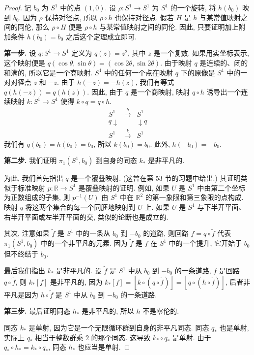 \begin{proof}
记 $b_0$ 为 $S^{1}$ 中的点 $(1,0)$. 设 $\rho\colon S^{1}\to S^{1}$ 为 $S^{1}$ 的一个旋转, 将 $h(b_0)$ 映到 $b_0$. 因为 $\rho$ 保持对径点, 所以 $\rho\circ h$ 也保持对径点. 假若 $H$ 是 $h$ 与某常值映射之间的同伦, 那么 $\rho\circ H$ 便是 $\rho\circ h$ 与某常值映射之间的同伦. 因此, 只要证明加上附加条件 $h(b_0)=b_0$ 之后这个定理成立即可.

\textbf{第一步.} 设 $q\colon S^{1}\to S^{1}$ 定义为 $q(z)=z^2$, 其中 $z$ 是一个复数. 如果用实坐标表示, 这个映射便是 $q(\cos\theta,\sin\theta)=(\cos 2\theta,\sin 2\theta)$. 由于映射 $q$ 是连续的、闭的和满的, 所以它是一个商映射. $S^{1}$ 中的任何一个点在映射 $q$ 下的原像是 $S^{1}$ 中的一对对径点 $z$ 和 $-z$. 由于 $h(-z)=-h(z)$, 我们有等式 $q(h(-z))=q(h(z))$. 因此, 由于 $q$ 是一个商映射, 映射 $q\circ h$ 诱导出一个连续映射 $k\colon S^{1}\to S^{1}$ 使得 $k\circ q=q\circ h$.
\[
\begin{array}{ccc}
S^{1} & \xrightarrow{h} & S^{1}\\
{\scriptstyle q}\downarrow & & \downarrow{\scriptstyle q}\\
S^{1} & \xrightarrow{k} & S^{1}
\end{array}
\]
我们有 $q(b_0)=h(b_0)=b_0$, 所以 $k(b_0)=b_0$. 此外, $h(-b_0)=-b_0$.

\textbf{第二步.} 我们证明 $\pi_1(S^{1},b_0)$ 到自身的同态 $k_*$ 是非平凡的.

为此, 我们首先指出 $q$ 是一个覆叠映射. (这曾在第 53 节的习题中给出.) 其证明类似于标准映射 $p\colon\mathbb{R}\to S^{1}$ 是覆叠映射的证明. 例如, 如果 $U$ 是 $S^{1}$ 中由第二个坐标为正数组成的子集, 则 $p^{-1}(U)$ 由 $S^{1}$ 中在 $\mathbb{R}^{2}$ 的第一象限和第三象限的点构成. 映射 $q$ 将这两个集合的每一个同胚地映射到 $U$ 上. 如果 $U$ 是 $S^{1}$ 与下半开平面、右半开平面或左半开平面的交, 类似的论断也是成立的.

其次, 注意如果 $\tilde{f}$ 是 $S^{1}$ 中的一条从 $b_0$ 到 $-b_0$ 的道路, 则回路 $f=q\circ\tilde{f}$ 代表 $\pi_1(S^{1},b_0)$ 中的一个非平凡的元素. 因为 $\tilde{f}$ 是 $f$ 在 $S^{1}$ 中的一个提升, 它开始于 $b_0$ 但不终结于 $b_0$.

最后我们指出 $k_*$ 是非平凡的. 设 $\tilde{f}$ 是 $S^{1}$ 中从 $b_0$ 到 $-b_0$ 的一条道路, $f$ 是回路 $q\circ\tilde{f}$, 则 $k_*[f]$ 是非平凡的, 因为 $k_*[f]=[k\circ(q\circ\tilde{f})]=[q\circ(h\circ\tilde{f})]$, 后者非平凡是因为 $h\circ\tilde{f}$ 是 $S^{1}$ 中从 $b_0$ 到 $-b_0$ 的一条道路.

\textbf{第三步.} 最后证明同态 $h_*$ 是非平凡的, 所以 $h$ 不是零伦的.

同态 $k_*$ 是单射, 因为它是一个无限循环群到自身的非平凡同态. 同态 $q_*$ 也是单射, 实际上 $q_*$ 相当于整数群乘 $2$ 的那个同态. 这导致 $k_*\circ q_*$ 是单射. 由于 $q_*\circ h_*=k_*\circ q_*$, 同态 $h_*$ 也应当是单射.
\end{proof}

